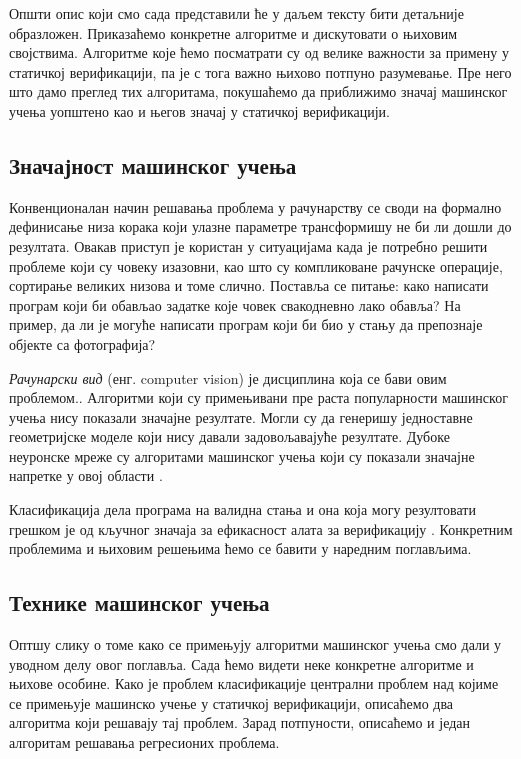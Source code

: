 \documentclass[a4paper]{article}
\begin{document}
{Општи опис који смо сада представили ће у даљем тексту бити детаљније образложен. Приказаћемо конкретне алгоритме и дискутовати о њиховим својствима. Алгоритме које ћемо посматрати су од велике важности за примену у статичкој верификацији, па је с тога важно њихово потпуно разумевање. Пре него што дамо преглед тих алгоритама, покушаћемо да приближимо значај машинског учења уопштено као и његов значај у статичкој верификацији.


\subsection{Значајност машинског учења}
Конвенционалан начин решавања проблема у рачунарству се своди на формално дефинисање низа корака који улазне параметре трансформишу не би ли дошли до резултата. Овакав приступ је користан у ситуацијама када је потребно решити проблеме који су човеку изазовни, као што су компликоване рачунске операције, сортирање великих низова и томе слично. Поставља се питање: како написати програм који би обављао задатке које човек свакодневно лако обавља? На пример, да ли је могуће написати програм који би био у стању да препознаје објекте са фотографија?


\textit{Рачунарски вид} (енг. computer vision) је дисциплина која се бави овим проблемом.\cite{old-cv}. Алгоритми који су примењивани пре раста популарности машинског учења нису показали значајне резултате. Могли су да генеришу једноставне геометријске моделе који нису давали задовољавајуће резултате. Дубоке неуронске мреже су алгоритами машинског учења који су показали значајне напретке у овој области \cite{new-cv}.


Класификација дела програма на валидна стања и она која могу резултовати грешком је од кључног значаја за ефикасност алата за верификацију \cite{Brun04findinglatent} \cite{KrishnaPW15}. Конкретним проблемима и њиховим решењима ћемо се бавити у наредним поглављима.


\subsection{Технике машинског учења}
Оптшу слику о томе како се примењују алгоритми машинског учења смо дали у уводном делу овог поглавља. Сада ћемо видети неке конкретне алгоритме и њихове особине. Како је проблем класификације централни проблем над којиме се примењује машинско учење у статичкој верификацији, описаћемо два алгоритма који решавају тај проблем. Зарад потпуности, описаћемо и један алгоритам решавања регресионих проблема.


}
\end{document}
